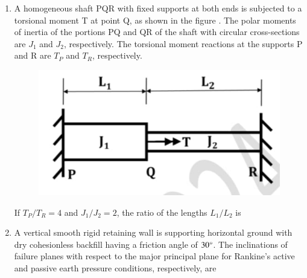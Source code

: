 \documentclass[journal,12pt,onecolumn]{article}
\theoremstyle{remark}
\begin{document}
\begin{enumerate}
    \item A homogeneous shaft PQR with fixed supports at both ends is subjected to a torsional moment T at point Q, as shown in the figure . The polar moments of inertia of the portions PQ and QR of the shaft with circular cross-sections are $J_1$ and $J_2$, respectively. The torsional moment reactions at the supports P and R are $T_P$ and $T_R$, respectively.
    \begin{figure}[H]
        \centering
        \includegraphics[width=0.7\columnwidth]{figs/1Q40.jpg}
        \caption{}
        \label{fig:q40}
    \end{figure}
    If $T_P/T_R = 4$ and $J_1/J_2 = 2$, the ratio of the lengths $L_1/L_2$ is
    
    \hfill{}
    \begin{enumerate}
    \end{enumerate}
    
    \item A vertical smooth rigid retaining wall is supporting horizontal ground with dry cohesionless backfill having a friction angle of $30\degree$. The inclinations of failure planes with respect to the major principal plane for Rankine's active and passive earth pressure conditions, respectively, are
    
    \hfill{}
    \begin{enumerate}
    \end{enumerate}
    

\end{enumerate}
\end{document}
